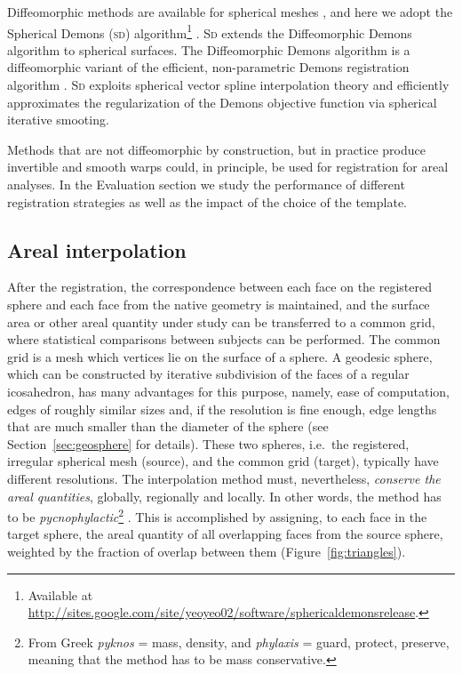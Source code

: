 Diffeomorphic methods are available for spherical meshes \citep{Glaunes2004, Yeo2010}, and here we adopt the Spherical Demons (\textsc{sd}) algorithm\footnote{Available at \href{http://sites.google.com/site/yeoyeo02/software/sphericaldemonsrelease}{http://sites.google.com/site/yeoyeo02/software/sphericaldemonsrelease}.} \citep{Yeo2010}. \textsc{Sd} extends the Diffeomorphic Demons algorithm \citep{Vercauteren2009} to spherical surfaces. The Diffeomorphic Demons algorithm is a diffeomorphic variant of the efficient, non-parametric Demons registration algorithm \citep{Thirion1998}. \textsc{Sd} exploits spherical vector spline interpolation theory and efficiently approximates the regularization of the Demons objective function via spherical iterative smooting.

Methods that are not diffeomorphic by construction, but in practice produce invertible and smooth warps could, in principle, be used for registration for areal analyses. In the Evaluation section we study the performance of different registration strategies as well as the impact of the choice of the template.

\subsection{Areal interpolation}

After the registration, the correspondence between each face on the registered sphere and each face from the native geometry is maintained, and the surface area or other areal quantity under study can be transferred to a common grid, where statistical comparisons between subjects can be performed. The common grid is a mesh which vertices lie on the surface of a sphere. A geodesic sphere, which can be constructed by iterative subdivision of the faces of a regular icosahedron, has many advantages for this purpose, namely, ease of computation, edges of roughly similar sizes and, if the resolution is fine enough, edge lengths that are much smaller than the diameter of the sphere (see Section~\ref{sec:geosphere} for details). These two spheres, i.e.\ the registered, irregular spherical mesh (source), and the common grid (target), typically have different resolutions. The interpolation method must, nevertheless, \emph{conserve the areal quantities}, globally, regionally and locally. In other words, the method has to be \emph{pycnophylactic}\footnote{From Greek \emph{pyknos} = mass, density, and \emph{phylaxis} = guard, protect, preserve, meaning that the method has to be mass conservative.} \citep{Tobler1979}. This is accomplished by assigning, to each face in the target sphere, the areal quantity of all overlapping faces from the source sphere, weighted by the fraction of overlap between them (Figure~\ref{fig:triangles}).

